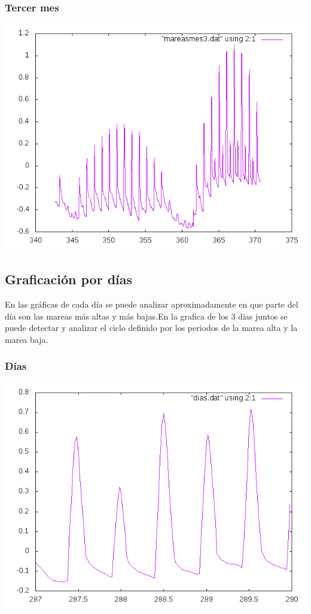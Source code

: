 \documentclass[10pt]{article}
\begin{document}
\subsubsection{Tercer mes}
\begin{center}
   \includegraphics[scale=0.8]{month3.png}
\end{center}


\newpage
\subsection{Graficación por días}
En las gráficas de cada día se puede analizar aproximadamente en que parte del día son las mareas más altas y más bajas.En la grafica de los 3 dias juntos se puede detectar y analizar el ciclo definido por los periodos de la marea alta y la marea baja.

\subsubsection{Días}
\begin{center}
   \includegraphics[scale=0.8]{dias.png}
\end{center}
\end{document}
